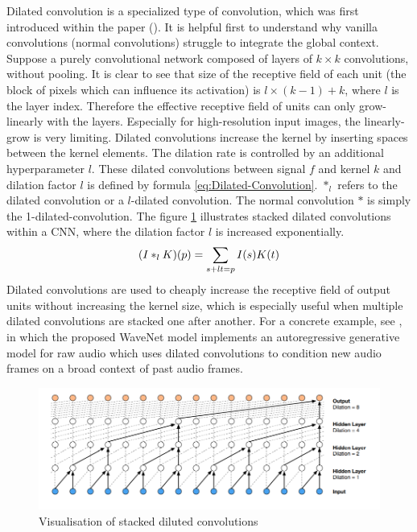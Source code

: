 Dilated convolution is a specialized type of convolution, which was first introduced within the paper (\cite{yu_multi-scale_2016}). It is helpful first to understand why vanilla convolutions (normal convolutions) struggle to integrate the global context. Suppose a purely convolutional network composed of layers of $k \times k$ convolutions, without pooling. It is clear to see that size of the receptive field of each unit (the block of pixels which can influence its activation) is $l \times (k-1) + k$, where $l$ is the layer index. Therefore the effective receptive field of units can only grow-linearly with the layers. Especially for high-resolution input images, the linearly-grow is very limiting.
\newline
\newline
Dilated convolutions increase the kernel by inserting spaces between the kernel elements. The dilation rate is controlled by an additional hyperparameter $l$. These dilated convolutions between signal $f$ and kernel $k$ and dilation factor $l$ is defined by formula \ref{eq:Dilated-Convolution}. $\ast_l$ refers to the dilated convolution or a $l$-dilated convolution. The normal convolution $\ast$ is simply the 1-dilated-convolution. The figure \ref{fig:Dilated-Convolution} illustrates stacked dilated convolutions within a \gls{CNN}, where the dilation factor $l$ is increased exponentially.
\begin{equation}
    \centering
    (I \ast_l K)(p) = \sum_{s + lt =p} I(s)K(t)
    \label{eq:Dilated-Convolution}
\end{equation}
Dilated convolutions are used to cheaply increase the receptive field of output units without increasing the kernel size, which is especially useful when multiple dilated convolutions are stacked one after another. For a concrete example, see \cite{oord_wavenet_2016}, in which the proposed WaveNet model implements an autoregressive generative model for raw audio which uses dilated convolutions to condition new audio frames on a broad context of past audio frames.

\begin{figure}[htbp]
	\centering
	\includegraphics[scale=0.9]{baa-documentation/img/Dilated_Colvolution.png}
	\caption[SINS database recording environment map]{Visualisation of stacked diluted convolutions \footnotemark}
	\label{fig:Dilated-Convolution}
\end{figure}

